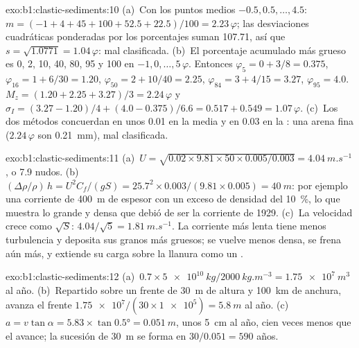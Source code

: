 \begin{solution}{exo:b1:clastic-sediments:10}
(a)~Con los puntos medios $-0.5, 0.5, \ldots, 4.5$: $m = (-1 + 4 + 45 + 100 + 52.5
+ 22.5)/100 = 2.23\,\varphi$; las desviaciones cuadráticas ponderadas por los porcentajes suman \num{107.71}, así que $s = \sqrt{1.0771} = 1.04\,\varphi$:
mal clasificada. (b)~El porcentaje acumulado más grueso es 0, 2, 10, 40, 80, 95 y
100 en $-1, 0, \ldots, 5\,\varphi$. Entonces $\varphi_5 = 0 + 3/8 = 0.375$,
$\varphi_{16} = 1 + 6/30 = 1.20$, $\varphi_{50} = 2 + 10/40 = 2.25$,
$\varphi_{84} = 3 + 4/15 = 3.27$, $\varphi_{95} = 4.0$. $M_z = (1.20 + 2.25 +
3.27)/3 = 2.24\,\varphi$ y $\sigma_I = (3.27 - 1.20)/4 + (4.0 - 0.375)/6.6 =
0.517 + 0.549 = 1.07\,\varphi$. (c)~Los dos métodos concuerdan en unos
\num{0.01} en la media y en \num{0.03} en la : una arena fina
($2.24\,\varphi$ son \qty{0.21}{mm}), mal clasificada.
\end{solution}

\begin{solution}{exo:b1:clastic-sediments:11}
(a)~$U = \sqrt{0.02 \times 9.81 \times 50 \times 0.005/0.003} =
\qty{4.04}{m.s^{-1}}$, o 7.9 nudos. (b)~$(\Delta\rho/\rho)\,h = U^2
C_f/(gS) = 25.7^2 \times 0.003/(9.81 \times 0.005) = \qty{40}{m}$: por ejemplo
una corriente de \qty{400}{m} de espesor con un exceso de densidad del \qty{10}{\percent}, lo que muestra lo grande y densa que debió de ser la corriente de 1929. (c)~La velocidad
crece como $\sqrt S$: $4.04/\sqrt 5 = \qty{1.81}{m.s^{-1}}$. La corriente más lenta tiene menos turbulencia y deposita sus granos más gruesos; se vuelve menos densa, se frena
aún más, y extiende su carga sobre la llanura como un .
\end{solution}

\begin{solution}{exo:b1:clastic-sediments:12}
(a)~$0.7 \times \qty{5e10}{kg}/\qty{2000}{kg.m^{-3}} = \qty{1.75e7}{m^3}$ al
año. (b)~Repartido sobre un frente de \qty{30}{m} de altura y \qty{100}{km} de anchura, avanza el frente $\num{1.75e7}/(30 \times \num{1e5}) = \qty{5.8}{m}$ al
año. (c)~$a = v\tan\alpha = 5.83 \times \tan\ang{0.5} = \qty{0.051}{m}$, unos
\qty{5}{cm} al año, cien veces menos que el avance; la sucesión de \qty{30}{m} se forma en
$30/0.051 = 590$ años.
\end{solution}

